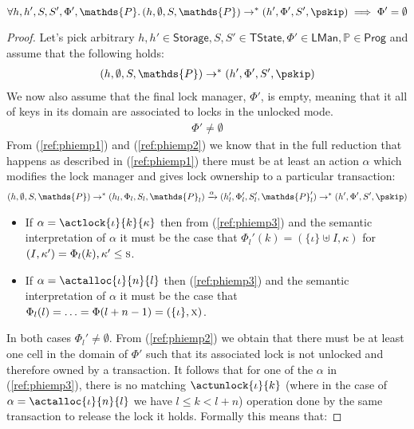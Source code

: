 \begin{lem}
	\label{ref:phiemp}
	\[
		\forall h, h', S, S', \Phi', \mathds{P} \ldotp
		(h, \emptyset, S, \mathds{P})	
			\rightarrow^*
		(h', \Phi', S', \pskip)
			\implies
		\Phi' = \emptyset
	\]
	{\parindent0pt
	\begin{proof}
		Let's pick arbitrary $h, h' \in \mathsf{Storage}, S, S' \in \mathsf{TState}, \Phi' \in \mathsf{LMan}, \mathds{P} \in \mathsf{Prog}$ and assume that the following holds:
		\begin{gather}
			\label{ref:phiemp1}
			(h, \emptyset, S,  \mathds{P}) \rightarrow^* (h', \Phi', S', \pskip)
		\end{gather}
		We now also assume that the final lock manager, $\Phi'$, is empty, meaning that it all of keys in its domain are associated to locks in the unlocked mode.
		\begin{gather}
			\label{ref:phiemp2}
			\Phi' \neq \emptyset
		\end{gather}
		From (\ref{ref:phiemp1}) and (\ref{ref:phiemp2}) we know that in the full reduction that happens as described in (\ref{ref:phiemp1}) there must be at least an action $\alpha$ which modifies the lock manager and gives lock ownership to a particular transaction:
		\begin{gather}
			\label{ref:phiemp3}
			(h, \emptyset, S,  \mathds{P}) \rightarrow^* (h_l, \Phi_l, S_l, \mathds{P}_l) \xrightarrow{\alpha} (h_l', \Phi_l', S_l', \mathds{P}_l') \rightarrow^* (h', \Phi', S', \pskip)
		\end{gather}
		\begin{itemize}
			\item If $\alpha = \actlock{\iota}{k}{\kappa}$ then from (\ref{ref:phiemp3}) and the semantic interpretation of $\alpha$ it must be the case that $\Phi_l'(k) = (\{\iota\} \uplus I, \kappa)$ for $(I, \kappa') = \Phi_l(k), \kappa' \leq \textsc{s}$.
			\item If $\alpha = \actalloc{\iota}{n}{l}$ then (\ref{ref:phiemp3}) and the semantic interpretation of $\alpha$ it must be the case that $\Phi_l(l) = \ldots = \Phi(l  + n - 1) = (\{\iota\}, \textsc{x})$.
		\end{itemize}
		In both cases $\Phi_l' \neq \emptyset$. From (\ref{ref:phiemp2}) we obtain that there must be at least one cell in the domain of $\Phi'$ such that its associated lock is not unlocked and therefore owned by a transaction. It follows that for one of the $\alpha$ in (\ref{ref:phiemp3}), there is no matching $\actunlock{\iota}{k}$ (where in the case of $\alpha = \actalloc{\iota}{n}{l}$ we have $l \leq k < l + n$) operation done by the same transaction to release the lock it holds. Formally this means that:

\end{proof}}
\end{lem}
